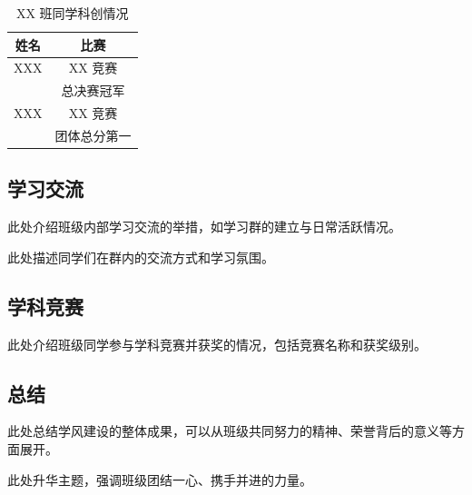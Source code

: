 \begin{table}[H]
    \centering
    \begin{tabular}{||c|c||}
    \hline
    \hline
    姓名   & 比赛          \\
    \hline
    XXX & XX 竞赛 \\
    & 总决赛冠军    \\
    \hline
    XXX & XX 竞赛        \\
    & 团体总分第一  \\
    \hline
    \hline
    \end{tabular}
    \caption{XX 班同学科创情况}
\end{table}

\subsection{学习交流}

此处介绍班级内部学习交流的举措，如学习群的建立与日常活跃情况。

此处描述同学们在群内的交流方式和学习氛围。


\subsection{学科竞赛}

此处介绍班级同学参与学科竞赛并获奖的情况，包括竞赛名称和获奖级别。

\subsection{总结}

此处总结学风建设的整体成果，可以从班级共同努力的精神、荣誉背后的意义等方面展开。

此处升华主题，强调班级团结一心、携手并进的力量。
